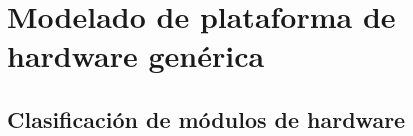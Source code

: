 \section{Modelado de plataforma de hardware genérica}
\label{sec:modelHardware}

\subsection{Clasificación de módulos de hardware}
